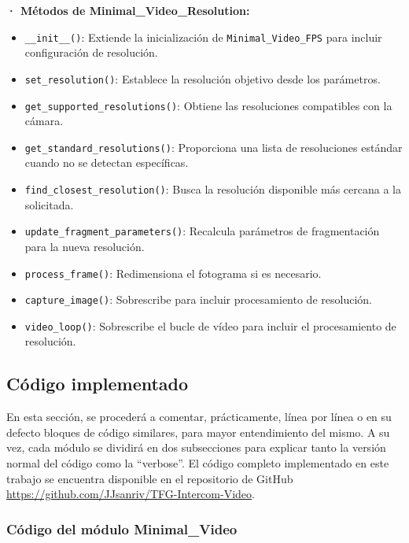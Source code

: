 \textbf{· Métodos de Minimal\_Video\_Resolution:} 
\begin{itemize} 
    \item \texttt{\_\_init\_\_()}: Extiende la inicialización de \texttt{Minimal\_Video\_FPS} para incluir configuración de resolución. 
    \item \texttt{set\_resolution()}: Establece la resolución objetivo desde los parámetros. 
    \item \texttt{get\_supported\_resolutions()}: Obtiene las resoluciones compatibles con la cámara. 
    \item \texttt{get\_standard\_resolutions()}: Proporciona una lista de resoluciones estándar cuando no se detectan específicas. 
    \item \texttt{find\_closest\_resolution()}: Busca la resolución disponible más cercana a la solicitada. 
    \item \texttt{update\_fragment\_parameters()}: Recalcula parámetros de fragmentación para la nueva resolución. 
    \item \texttt{process\_frame()}: Redimensiona el fotograma si es necesario. 
    \item \texttt{capture\_image()}: Sobrescribe para incluir procesamiento de resolución. 
    \item \texttt{video\_loop()}: Sobrescribe el bucle de vídeo para incluir el procesamiento de resolución.
\end{itemize}

\newpage

\subsection{Código implementado}
En esta sección, se procederá a comentar, prácticamente, línea por línea o en su defecto bloques de código similares, para mayor entendimiento del mismo. A su vez, cada módulo se dividirá en dos subsecciones para explicar tanto la versión normal del código como la ``verbose''. El código completo implementado en este trabajo se encuentra disponible en el repositorio de GitHub \url{https://github.com/JJsanriv/TFG-Intercom-Video}.

\subsubsection{Código del módulo Minimal\_Video}

